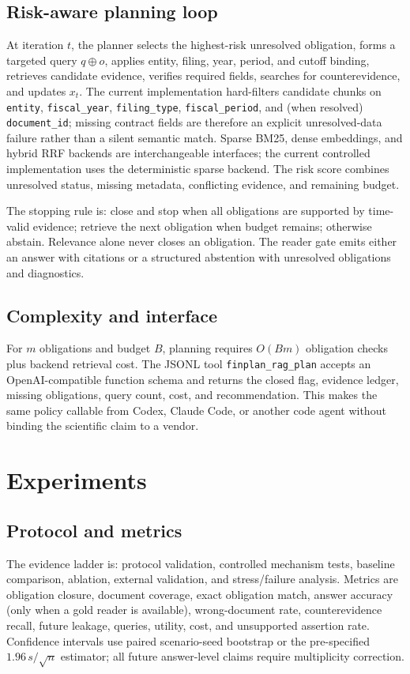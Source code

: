 \documentclass[12pt]{article}
\begin{document}
\subsection{Risk-aware planning loop}
At iteration $t$, the planner selects the highest-risk unresolved obligation, forms a targeted query $q\oplus o$, applies entity, filing, year, period, and cutoff binding, retrieves candidate evidence, verifies required fields, searches for counterevidence, and updates $x_t$. The current implementation hard-filters candidate chunks on \texttt{entity}, \texttt{fiscal\_year}, \texttt{filing\_type}, \texttt{fiscal\_period}, and (when resolved) \texttt{document\_id}; missing contract fields are therefore an explicit unresolved-data failure rather than a silent semantic match. Sparse BM25, dense embeddings, and hybrid RRF backends are interchangeable interfaces; the current controlled implementation uses the deterministic sparse backend. The risk score combines unresolved status, missing metadata, conflicting evidence, and remaining budget.

The stopping rule is: close and stop when all obligations are supported by time-valid evidence; retrieve the next obligation when budget remains; otherwise abstain. Relevance alone never closes an obligation. The reader gate emits either an answer with citations or a structured abstention with unresolved obligations and diagnostics.

\subsection{Complexity and interface}
For $m$ obligations and budget $B$, planning requires $O(Bm)$ obligation checks plus backend retrieval cost. The JSONL tool \texttt{finplan\_rag\_plan} accepts an OpenAI-compatible function schema and returns the closed flag, evidence ledger, missing obligations, query count, cost, and recommendation. This makes the same policy callable from Codex, Claude Code, or another code agent without binding the scientific claim to a vendor.

\section{Experiments}
\subsection{Protocol and metrics}
The evidence ladder is: protocol validation, controlled mechanism tests, baseline comparison, ablation, external validation, and stress/failure analysis. Metrics are obligation closure, document coverage, exact obligation match, answer accuracy (only when a gold reader is available), wrong-document rate, counterevidence recall, future leakage, queries, utility, cost, and unsupported assertion rate. Confidence intervals use paired scenario-seed bootstrap or the pre-specified $1.96\,s/\sqrt{n}$ estimator; all future answer-level claims require multiplicity correction.
\end{document}
